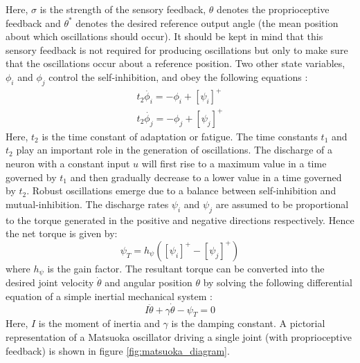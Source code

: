 \documentclass[12pt,twoside]{article}
\theoremstyle{plain}
\theoremstyle{definition}
\theoremstyle{remark}
\begin{document}
Here, $\sigma$ is the strength of the sensory feedback, $\theta$ denotes the proprioceptive feedback and $\theta^{*}$ denotes the desired reference output angle (the mean position about which oscillations should occur). It should be kept in mind that this sensory feedback is not required for producing oscillations but only to make sure that the oscillations occur about a reference position. Two other state variables, $\phi_i$ and $\phi_j$ control the self-inhibition, and obey the following equations \cite{Ronsse2009}: 
\begin{subequations} 
\label{eq:matsuoka_phi}
\begin{align}
 t_2 \dot{\phi_i}=-\phi_i + [\psi_i]^+\\
 t_2 \dot{\phi_j}=-\phi_j + [\psi_j]^+
 \end{align}
\end{subequations}
Here, $t_2$ is the time constant of adaptation or fatigue. The time constants $t_1$ and $t_2$ play an important role in the generation of oscillations. The discharge of a neuron with a constant input $u$ will first rise to a maximum value in a time governed by $t_1$ and then gradually decrease to a lower value in a time governed by $t_2$. Robust oscillations emerge due to a balance between self-inhibition and mutual-inhibition. The discharge rates $\psi_i$ and $\psi_j$ are assumed to be proportional to the torque generated in the positive and negative directions respectively. Hence the net torque is given by: 
\begin{equation}
\label{eq:matsuoka_net_torque}
\psi_T=h_{\psi}([\psi_i]^+ - [\psi_j]^+)
\end{equation}
where $h_{\psi}$ is the gain factor. The resultant torque can be converted into the desired joint velocity $\dot{\theta}$ and angular position $\theta$ by solving the following differential equation of a simple inertial mechanical system \cite{Ronsse2009}:
\begin{equation}
\label{eq:inertial_system}
I\ddot{\theta} + \gamma \dot{\theta} - \psi_T = 0
\end{equation}
Here, $I$ is the moment of inertia and $\gamma$ is the damping constant. A pictorial representation of a Matsuoka oscillator driving a single joint (with proprioceptive feedback) is shown in figure \ref{fig:matsuoka_diagram}.
\end{document}
